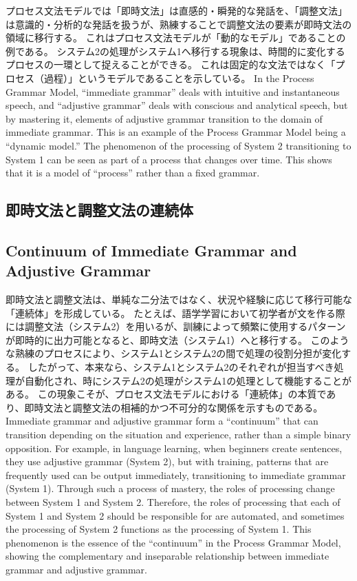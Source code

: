 \documentclass[a4paper,xelatex,ja=standard]{bxjsarticle}
\begin{document}
\ifJPN
プロセス文法モデルでは「即時文法」は直感的・瞬発的な発話を、「調整文法」は意識的・分析的な発話を扱うが、熟練することで調整文法の要素が即時文法の領域に移行する。
これはプロセス文法モデルが「動的なモデル」であることの例である。
システム2の処理がシステム1へ移行する現象は、時間的に変化するプロセスの一環として捉えることができる。
これは固定的な文法ではなく「プロセス（過程）」というモデルであることを示している。
\else
In the Process Grammar Model, ``immediate grammar'' deals with intuitive and instantaneous speech, and ``adjustive grammar'' deals with conscious and analytical speech, but by mastering it, elements of adjustive grammar transition to the domain of immediate grammar.
This is an example of the Process Grammar Model being a ``dynamic model.''
The phenomenon of the processing of System 2 transitioning to System 1 can be seen as part of a process that changes over time.
This shows that it is a model of ``process'' rather than a fixed grammar.
\fi

\ifJPN
  \subsection{即時文法と調整文法の連続体}
\else
  \subsection{Continuum of Immediate Grammar and Adjustive Grammar}
\fi

\ifJPN
即時文法と調整文法は、単純な二分法ではなく、状況や経験に応じて移行可能な「連続体」を形成している。
たとえば、語学学習において初学者が文を作る際には調整文法（システム2）を用いるが、訓練によって頻繁に使用するパターンが即時的に出力可能となると、即時文法（システム1）へと移行する。
このような熟練のプロセスにより、システム1とシステム2の間で処理の役割分担が変化する。
したがって、本来なら、システム1とシステム2のそれぞれが担当すべき処理が自動化され、時にシステム2の処理がシステム1の処理として機能することがある。
この現象こそが、プロセス文法モデルにおける「連続体」の本質であり、即時文法と調整文法の相補的かつ不可分的な関係を示すものである。
\else
Immediate grammar and adjustive grammar form a ``continuum'' that can transition depending on the situation and experience, rather than a simple binary opposition.
For example, in language learning, when beginners create sentences, they use adjustive grammar (System 2), but with training, patterns that are frequently used can be output immediately, transitioning to immediate grammar (System 1).
Through such a process of mastery, the roles of processing change between System 1 and System 2.
Therefore, the roles of processing that each of System 1 and System 2 should be responsible for are automated, and sometimes the processing of System 2 functions as the processing of System 1.
This phenomenon is the essence of the ``continuum'' in the Process Grammar Model, showing the complementary and inseparable relationship between immediate grammar and adjustive grammar.
\fi
\end{document}
